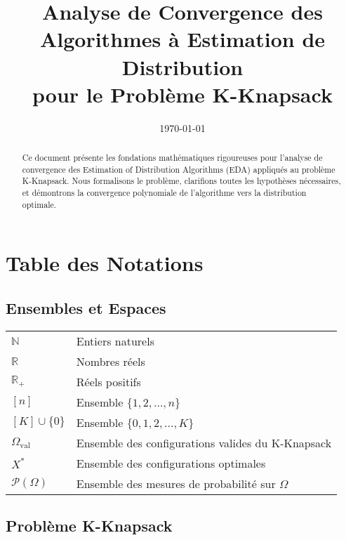 \documentclass[12pt,a4paper]{article}
\title{Analyse de Convergence des Algorithmes à Estimation de Distribution\\
	pour le Problème K-Knapsack}
\author{}
\date{\today}
\theoremstyle{definition}
\theoremstyle{remark}
\newcommand{\R}{\mathbb{R}}
\newcommand{\N}{\mathbb{N}}
\begin{document}
	
	\maketitle
	
	\begin{abstract}
		Ce document présente les fondations mathématiques rigoureuses pour l'analyse de convergence des Estimation of Distribution Algorithms (EDA) appliqués au problème K-Knapsack. Nous formalisons le problème, clarifions toutes les hypothèses nécessaires, et démontrons la convergence polynomiale de l'algorithme vers la distribution optimale.
	\end{abstract}
	
	\tableofcontents
	\newpage
	
	\section*{Table des Notations}
	
	\subsection*{Ensembles et Espaces}
	
	\begin{tabular}{ll}
		$\N$ & Entiers naturels \\
		$\R$ & Nombres réels \\
		$\R_+$ & Réels positifs \\
		$[n]$ & Ensemble $\{1, 2, \ldots, n\}$ \\
		$[K] \cup \{0\}$ & Ensemble $\{0, 1, 2, \ldots, K\}$ \\
		$\Omega_{\text{val}}$ & Ensemble des configurations valides du K-Knapsack \\
		$X^*$ & Ensemble des configurations optimales \\
		$\mathcal{P}(\Omega)$ & Ensemble des mesures de probabilité sur $\Omega$ \\
	\end{tabular}
	
	\subsection*{Problème K-Knapsack}
	
\end{document}
